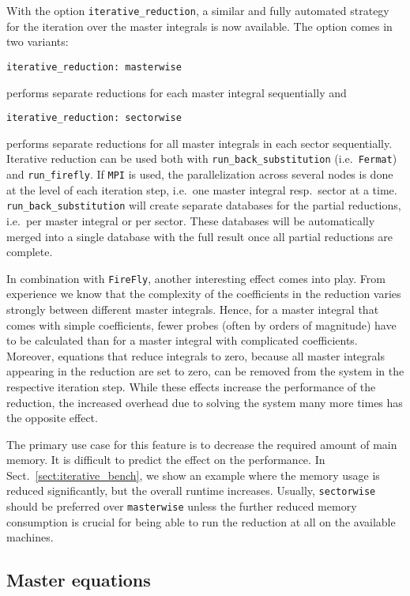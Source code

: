 \documentclass[11pt,a4paper,DIV=11,numbers=noenddot,parskip=half]{scrartcl}
\newcommand{\code}[1]{\texttt{#1}}
\newcommand*{\firefly}{\code{FireFly}}
\begin{document}
With the option \code{iterative\_reduction}, a similar and fully automated strategy for the iteration over the master integrals is now available.
The option comes in two variants:
\begin{verbatim}
iterative_reduction: masterwise
\end{verbatim}
performs separate reductions for each master integral sequentially and
\begin{verbatim}
iterative_reduction: sectorwise
\end{verbatim}
performs separate reductions for all master integrals in each sector sequentially.
Iterative reduction can be used both with \code{run\_back\_substitution} (i.e.\ \code{Fermat}) and \code{run\_firefly}.
If \code{MPI} is used, the parallelization across several nodes is done at the level of each iteration step, i.e.\ one master integral resp.\ sector at a time.
\code{run\_back\_substitution} will create separate databases for the partial reductions, i.e.\ per master integral or per sector.
These databases will be automatically merged into a single database with the full result once all partial reductions are complete.

In combination with \firefly{}, another interesting effect comes into play.
From experience we know that the complexity of the coefficients in the reduction varies strongly between different master integrals.
Hence, for a master integral that comes with simple coefficients, fewer probes (often by orders of magnitude) have to be calculated than for a master integral with complicated coefficients.
Moreover, equations that reduce integrals to zero, because all master integrals appearing in the reduction are set to zero, can be removed from the system in the respective iteration step.
While these effects increase the performance of the reduction, the increased overhead due to solving the system many more times has the opposite effect.

The primary use case for this feature is to decrease the required amount of main memory.
It is difficult to predict the effect on the performance.
In Sect.~\ref{sect:iterative_bench}, we show an example where the memory usage is reduced significantly, but the overall runtime increases.
Usually, \code{sectorwise} should be preferred over \code{masterwise} unless the further reduced memory consumption is crucial for being able to run the reduction at all on the available machines.


\subsection{Master equations}
\label{subsect:master-equations}
\end{document}
